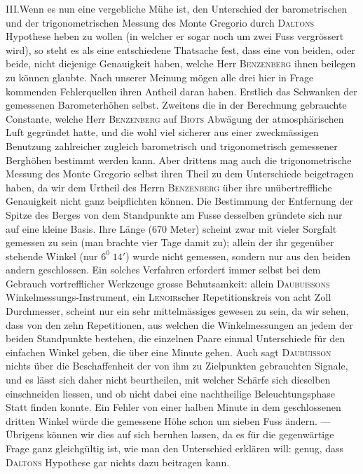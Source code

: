 III.\quad Wenn es nun eine vergebliche Mühe ist, den Unterschied der barometrischen und der trigonometrischen Messung des Monte Gregorio durch \textsc{Daltons} Hypothese heben zu wollen (in welcher er sogar noch um zwei Fuss vergrössert wird), so steht es als eine entschiedene Thatsache fest, dass eine von beiden, oder beide, nicht diejenige Genauigkeit haben, welche Herr \textsc{Benzenberg} ihnen beilegen zu können glaubte. Nach unserer Meinung mögen alle drei hier in Frage kommenden Fehlerquellen ihren Antheil daran haben. Erstlich das Schwanken der gemessenen Barometerhöhen selbst. Zweitens die in der Berechnung gebrauchte Constante, welche Herr \textsc{Benzenberg} auf \textsc{Biots} Abwägung der atmosphärischen Luft gegründet hatte, und die wohl viel sicherer aus einer zweckmässigen Benutzung zahlreicher zugleich barometrisch und trigonometrisch gemessener Berghöhen bestimmt werden kann. Aber drittens mag auch die trigonometrische Messung des Monte Gregorio selbst ihren Theil zu dem Unterschiede beigetragen haben, da wir dem Urtheil des Herrn \textsc{Benzenberg} über ihre unübertreffliche Genauigkeit nicht ganz beipflichten können. Die Bestimmung der Entfernung der Spitze des Berges von dem Standpunkte am Fusse desselben gründete sich nur auf eine kleine Basis. Ihre Länge (670 Meter) scheint zwar mit vieler Sorgfalt gemessen zu sein (man brachte vier Tage damit zu); allein der ihr gegenüber stehende Winkel (nur $6^0\;14'$) wurde nicht gemessen, sondern nur aus den beiden andern geschlossen. Ein solches Verfahren erfordert immer selbst bei dem Gebrauch vortrefflicher Werkzeuge grosse Behutsamkeit: allein \textsc{Daubuissons} Winkelmessungs-Instrument, ein \textsc{Lenoir}scher Repetitionskreis von acht Zoll Durchmesser, scheint nur ein sehr mittelmässiges gewesen zu sein, da wir sehen, dass von den zehn Repetitionen, aus welchen die Winkelmessungen an jedem der beiden Standpunkte bestehen, die einzelnen Paare einmal Unterschiede für den einfachen Winkel geben, die über eine Minute gehen. Auch sagt \textsc{Daubuisson} nichts über die Beschaffenheit der von ihm zu Zielpunkten gebrauchten Signale, und es lässt sich daher nicht beurtheilen, mit welcher Schärfe sich dieselben einschneiden liessen, und ob nicht dabei eine nachtheilige Beleuchtungsphase Statt finden konnte. Ein Fehler von einer halben Minute in dem geschlossenen dritten Winkel würde die gemessene Höhe schon um sieben Fuss ändern. — Übrigens können wir dies auf sich beruhen lassen, da es für die gegenwärtige Frage ganz gleichgültig ist, wie man den Unterschied erklären will: genug, dass \textsc{Daltons} Hypothese gar nichts dazu beitragen kann.

